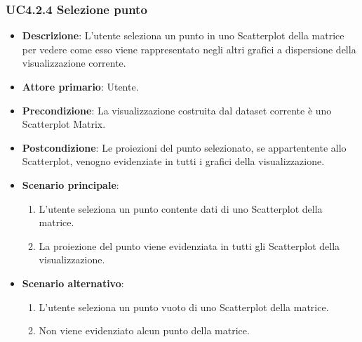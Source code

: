 \subsubsection{UC4.2.4 Selezione punto}
\label{ssub:uc4.2.4}
\begin{itemize}
    \item \textbf{Descrizione}: L'utente seleziona un punto in uno Scatterplot della matrice per vedere come 
                                esso viene rappresentato negli altri grafici a dispersione della visualizzazione corrente.
	
    \item \textbf{Attore primario}: Utente.
    
    \item \textbf{Precondizione}:   La visualizzazione costruita dal dataset corrente è uno Scatterplot Matrix.
    \item \textbf{Postcondizione}:  Le proiezioni del punto selezionato, se appartentente allo Scatterplot, 
                                    venogno evidenziate in tutti i grafici della visualizzazione.

	\item \textbf{Scenario principale}:
        \begin{enumerate}
            \item L'utente seleziona un punto contente dati di uno Scatterplot della matrice.
            \item La proiezione del punto viene evidenziata in tutti gli Scatterplot della visualizzazione.
        \end{enumerate}

    \item \textbf{Scenario alternativo}:
        \begin{enumerate}
            \item L'utente seleziona un punto vuoto di uno Scatterplot della matrice.
            \item Non viene evidenziato alcun punto della matrice.
        \end{enumerate}

\end{itemize}


